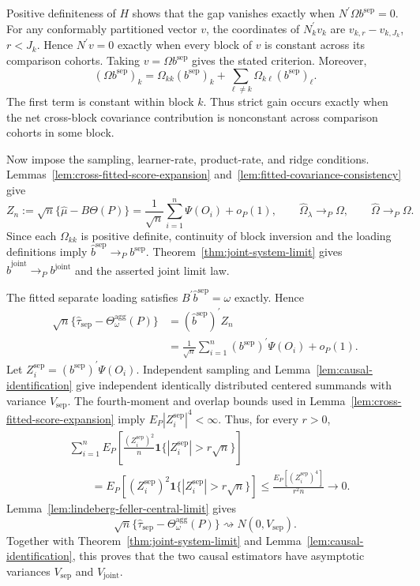 Positive definiteness of \(H\) shows that the gap vanishes exactly when \(N^{\prime}\Omega b^{\mathrm{sep}}=0\). For any conformably partitioned vector \(v\), the coordinates of \(N_k^{\prime}v_k\) are \(v_{k,r}-v_{k,J_k}\), \(r<J_k\). Hence \(N^{\prime}v=0\) exactly when every block of \(v\) is constant across its comparison cohorts. Taking \(v=\Omega b^{\mathrm{sep}}\) gives the stated criterion. Moreover,
\[
 (\Omega b^{\mathrm{sep}})_k
 =\Omega_{kk}(b^{\mathrm{sep}})_k
 +\sum_{\ell\ne k}\Omega_{k\ell}(b^{\mathrm{sep}})_\ell.
\]
The first term is constant within block \(k\). Thus strict gain occurs exactly when the net cross-block covariance contribution is nonconstant across comparison cohorts in some block.

Now impose the sampling, learner-rate, product-rate, and ridge conditions. Lemmas~\ref{lem:cross-fitted-score-expansion} and~\ref{lem:fitted-covariance-consistency} give
\[
 Z_n:=\sqrt n\{\widehat\mu-B\Theta(P)\}
 =\frac1{\sqrt n}\sum_{i=1}^n\Psi(O_i)+o_P(1),
 \qquad
 \widehat\Omega_\lambda\to_P\Omega,
 \qquad
 \widehat\Omega\to_P\Omega.
\]
Since each \(\Omega_{kk}\) is positive definite, continuity of block inversion and the loading definitions imply \(\widehat b^{\mathrm{sep}}\to_Pb^{\mathrm{sep}}\). Theorem~\ref{thm:joint-system-limit} gives \(\widehat b^{\mathrm{joint}}\to_Pb^{\mathrm{joint}}\) and the asserted joint limit law.

The fitted separate loading satisfies \(B^{\prime}\widehat b^{\mathrm{sep}}=\omega\) exactly. Hence
\[
\begin{aligned}
 \sqrt n\{\widehat\tau_{\mathrm{sep}}-
 \Theta_\omega^{\mathrm{agg}}(P)\}
 &=(\widehat b^{\mathrm{sep}})^{\prime}Z_n\\
 &=\frac1{\sqrt n}\sum_{i=1}^n
 (b^{\mathrm{sep}})^{\prime}\Psi(O_i)+o_P(1).
\end{aligned}
\]
Let \(Z_i^{\mathrm{sep}}=(b^{\mathrm{sep}})^{\prime}\Psi(O_i)\). Independent sampling and Lemma~\ref{lem:causal-identification} give independent identically distributed centered summands with variance \(V_{\mathrm{sep}}\). The fourth-moment and overlap bounds used in Lemma~\ref{lem:cross-fitted-score-expansion} imply \(E_P|Z_i^{\mathrm{sep}}|^4<\infty\). Thus, for every \(r>0\),
\[
\begin{aligned}
 &\sum_{i=1}^nE_P\!\left[
 \frac{(Z_i^{\mathrm{sep}})^2}{n}
 \mathbf 1\{|Z_i^{\mathrm{sep}}|>r\sqrt n\}\right]\\
 &\qquad=E_P[(Z_i^{\mathrm{sep}})^2
 \mathbf 1\{|Z_i^{\mathrm{sep}}|>r\sqrt n\}]
 \le\frac{E_P[(Z_i^{\mathrm{sep}})^4]}{r^2n}\longrightarrow0.
\end{aligned}
\]
Lemma~\ref{lem:lindeberg-feller-central-limit} gives
\[
 \sqrt n\{\widehat\tau_{\mathrm{sep}}-
 \Theta_\omega^{\mathrm{agg}}(P)\}
 \rightsquigarrow N(0,V_{\mathrm{sep}}).
\]
Together with Theorem~\ref{thm:joint-system-limit} and Lemma~\ref{lem:causal-identification}, this proves that the two causal estimators have asymptotic variances \(V_{\mathrm{sep}}\) and \(V_{\mathrm{joint}}\).

